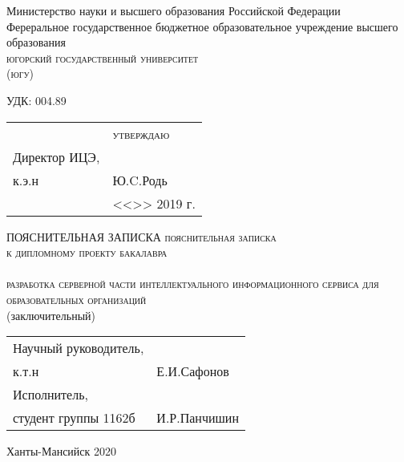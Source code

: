 \begin{titlepage}
    \begin{center}
        Министерство науки и высшего образования Российской Федерации\\
        Фереральное государственное бюджетное образовательное учреждение высшего образования\\
        \textsc{югорский государственный университет\\
        (югу)}
    \end{center}

    \vfill

    УДК: 004.89

    \newcommand{\signplace}{\underline{\hspace{40mm}}}
    \newcommand{\dateblank}{<<\underline{\hspace{10mm}}>> \underline{\hspace{30mm}} 2019 г.}
    \begin{tabular}{p{70mm}p{80mm}}
        & \textsc{утверждаю}\\
        Директор ИЦЭ,\\
        к.э.н
        &
        \signplace Ю.C.Родь\\
        & \dateblank
    \end{tabular}

    \vfill

    \begin{center}
        ПОЯСНИТЕЛЬНАЯ ЗАПИСКА
        \textsc{пояснительная записка\\
        к дипломному проекту бакалавра}\\
        \\
        \textsc{разработка серверной части интеллектуального информационного сервиса для образовательных организаций}\\
        (заключительный)
    \end{center}

    \vfill

    \begin{tabular}{p{50mm}p{80mm}}
        Научный руководитель,\\
        к.т.н
        &
        \signplace Е.И.Сафонов\\
        \vspace{5mm}
        Исполнитель,\\
        студент группы 1162б
        &
        \signplace И.Р.Панчишин\\
    \end{tabular}

    \vfill
    
    \begin{center}
        Ханты-Мансийск 2020
    \end{center}
\end{titlepage}

\setcounter{page}{2}
